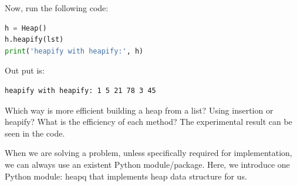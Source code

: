 \documentclass[main.tex]{subfiles}
\begin{document}
Now, run the following code:
\begin{lstlisting}[language=Python]
h = Heap()
h.heapify(lst)
print('heapify with heapify:', h)
\end{lstlisting}
Out put is:
\begin{lstlisting}
heapify with heapify: 1 5 21 78 3 45 
\end{lstlisting}
\begin{bclogo}[couleur = blue!30, arrondi=0.1,logo=\bccrayon,ombre=true]{Which way is more efficient building a heap from a list?} Using insertion or heapify? What is the efficiency of each method? The experimental result can be seen in the code.
\end{bclogo}
When we are solving a problem, unless specifically required for implementation, we can always use an existent Python module/package. Here, we introduce one Python module: heapq that implements heap data structure for us. 
\end{document}
